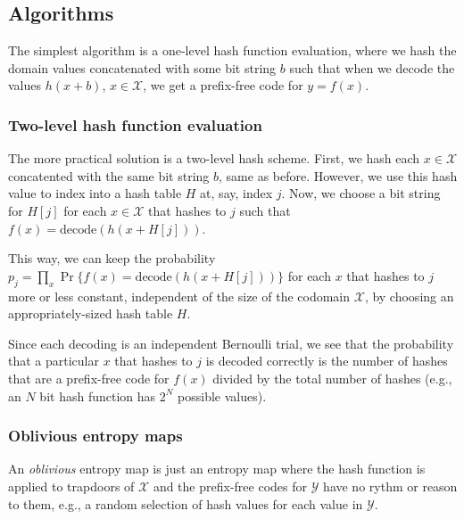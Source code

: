 \documentclass[
]{article}
\begin{document}
\hypertarget{algorithms}{%
\subsection{Algorithms}\label{algorithms}}

The simplest algorithm is a one-level hash function evaluation, where we
hash the domain values concatenated with some bit string \(b\) such that
when we decode the values \(h(x + b)\), \(x \in \mathcal{X}\), we get a
prefix-free code for \(y = f(x)\).

\hypertarget{two-level-hash-function-evaluation}{%
\subsubsection{Two-level hash function
evaluation}\label{two-level-hash-function-evaluation}}

The more practical solution is a two-level hash scheme. First, we hash
each \(x \in \mathcal{X}\) concatented with the same bit string \(b\),
same as before. However, we use this hash value to index into a hash
table \(H\) at, say, index \(j\). Now, we choose a bit string for
\(H[j]\) for each \(x \in \mathcal{X}\) that hashes to \(j\) such that
\(f(x) = \text{decode}(h(x + H[j]))\).

This way, we can keep the probability
\(p_j = \prod_x \Pr\{ f(x) = \text{decode}(h(x + H[j]))\}\) for each
\(x\) that hashes to \(j\) more or less constant, independent of the
size of the codomain \(\mathcal{X}\), by choosing an appropriately-sized
hash table \(H\).

Since each decoding is an independent Bernoulli trial, we see that the
probability that a particular \(x\) that hashes to \(j\) is decoded
correctly is the number of hashes that are a prefix-free code for
\(f(x)\) divided by the total number of hashes (e.g., an \(N\) bit hash
function has \(2^N\) possible values).

\hypertarget{oblivious-entropy-maps}{%
\subsubsection{Oblivious entropy maps}\label{oblivious-entropy-maps}}

An \emph{oblivious} entropy map is just an entropy map where the hash
function is applied to trapdoors of \(\mathcal{X}\) and the prefix-free
codes for \(\mathcal{Y}\) have no rythm or reason to them, e.g., a
random selection of hash values for each value in \(\mathcal{Y}\).
\end{document}
